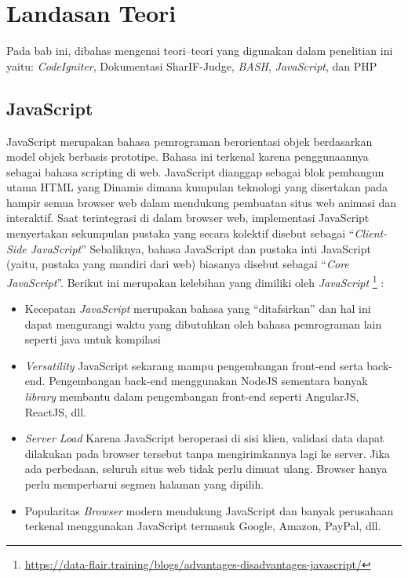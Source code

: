 \chapter{Landasan Teori}
\label{chap:teori}
Pada bab ini, dibahas mengenai teori–teori yang digunakan dalam penelitian ini yaitu: \textit{CodeIgniter}, Dokumentasi SharIF-Judge, \textit{BASH}, \textit{JavaScript}, dan PHP

\section{JavaScript}
\label{sec:JavaScript} 
JavaScript merupakan bahasa pemrograman berorientasi objek berdasarkan model objek berbasis prototipe\cite{javascript_programming}.  Bahasa ini terkenal karena penggunaannya sebagai bahasa scripting di web. JavaScript dianggap sebagai blok pembangun utama HTML yang Dinamis dimana kumpulan teknologi yang disertakan pada hampir semua browser web dalam mendukung pembuatan situs web animasi dan interaktif. Saat terintegrasi di dalam browser web, implementasi JavaScript menyertakan sekumpulan pustaka yang secara kolektif disebut sebagai ``\textit{Client-Side JavaScript}'' Sebaliknya, bahasa JavaScript dan pustaka inti JavaScript (yaitu, pustaka yang mandiri dari web) biasanya disebut sebagai ``\textit{Core JavaScript}''. Berikut ini merupakan kelebihan yang dimiliki oleh \textit{JavaScript} \footnote{\url{https://data-flair.training/blogs/advantages-disadvantages-javascript/}} :
\begin{itemize}
    \item Kecepatan \newline
    \textit{JavaScript} merupakan bahasa yang ``ditafsirkan'' dan hal ini dapat mengurangi waktu yang dibutuhkan oleh bahasa pemrograman lain seperti java untuk kompilasi
    \item \textit{Versatility} \newline
    JavaScript sekarang mampu pengembangan front-end serta back-end. Pengembangan back-end menggunakan NodeJS sementara banyak \textit{library} membantu dalam pengembangan front-end seperti AngularJS, ReactJS, dll. 
    \item \textit{Server Load} \newline
    Karena JavaScript beroperasi di sisi klien, validasi data dapat dilakukan pada browser tersebut tanpa mengirimkannya lagi ke server. Jika ada perbedaan, seluruh situs web tidak perlu dimuat ulang. Browser hanya perlu memperbarui segmen halaman yang dipilih. 
    \item Popularitas \newline
     \textit{Browser} modern mendukung JavaScript dan banyak perusahaan terkenal menggunakan JavaScript termasuk Google, Amazon, PayPal, dll. 
\end{itemize}

